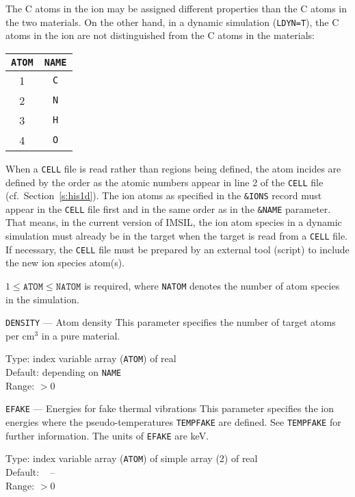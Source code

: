 The C atoms in the ion may be assigned different properties than the C atoms in
the two materials. On the other hand, in a dynamic simulation (\texttt{LDYN=T}),
the C atoms in the ion are not distinguished from the C atoms in the materials:

\begin{tabular}{cc}
  \texttt{ATOM} & \texttt{NAME} \\
  \hline
  1 & \texttt{C} \\
  2 & \texttt{N} \\
  3 & \texttt{H} \\
  4 & \texttt{O}
\end{tabular}

When a \texttt{CELL} file is read rather than regions being defined, the atom
incides are defined by the order as the atomic numbers appear in line 2 of the
\texttt{CELL} file (cf.\ Section~\ref{s:his1d}). The ion atoms as specified in
the \texttt{\&IONS} record must appear in the \texttt{CELL} file first and in
the same order as in the \texttt{\&NAME} parameter. That means, in the current
version of IMSIL, the ion atom species in a dynamic simulation must already be
in the target when the target is read from a \texttt{CELL} file. If necessary,
the \texttt{CELL} file must be prepared by an external tool (script) to include
the new ion species atom(s).

$1 \le \texttt{ATOM} \le \texttt{NATOM}$ is required, where \texttt{NATOM}
denotes the number of atom species in the simulation.

\begin{keydescription}{\texttt{DENSITY} --- Atom density}
%
  This parameter specifies the number of target atoms per cm$^3$ in a pure material.
  
  \begin{keytab}
    Type:    \> index variable array (\texttt{ATOM}) of real \\
    Default: \> depending on \texttt{NAME} \\
    Range:   \> $> 0$
  \end{keytab}
\end{keydescription}

\begin{keydescription}{\texttt{EFAKE} --- Energies for fake thermal vibrations}
%
  This parameter specifies the ion energies where the pseudo-temperatures 
  \texttt{TEMPFAKE} are defined. See \texttt{TEMPFAKE} for further information.
  The units of \texttt{EFAKE} are keV.
  \begin{keytab}
    Type:    \> index variable array (\texttt{ATOM}) of simple array (2) of real \\
    Default: \> ~ -- \\
    Range:   \> $> 0$
  \end{keytab}
\end{keydescription}

